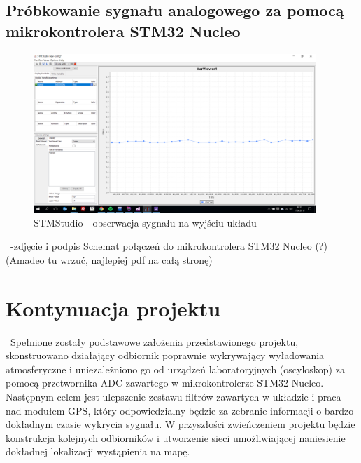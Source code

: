 \documentclass[12pt]{article}
\begin{document}
\subsection{Próbkowanie sygnału analogowego za pomocą mikrokontrolera STM32 Nucleo}
\begin{figure}[H]
\begin{center}
\includegraphics[width=0.95\textwidth]{figures/stmstudio.png}
\caption{STMStudio - obserwacja sygnału na wyjściu układu}
\end{center}
\end{figure}
\ -zdjęcie i podpis Schemat połączeń do mikrokontrolera STM32 Nucleo (?)\\
(Amadeo tu wrzuć, najlepiej pdf na całą stronę)

\section{Kontynuacja projektu}
\ Spełnione zostały podstawowe założenia przedstawionego projektu, skonstruowano działający odbiornik poprawnie wykrywający wyładowania atmosferyczne i uniezależniono go od urządzeń laboratoryjnych (oscyloskop) za pomocą przetwornika ADC zawartego w mikrokontrolerze STM32 Nucleo. Następnym celem jest ulepszenie zestawu filtrów zawartych w układzie i praca nad modułem GPS, który odpowiedzialny będzie za zebranie informacji o bardzo dokładnym czasie wykrycia sygnału. W przyszłości zwieńczeniem projektu będzie konstrukcja kolejnych odbiorników i utworzenie sieci umożliwiającej naniesienie dokładnej lokalizacji wystąpienia na mapę. 
\end{document}
